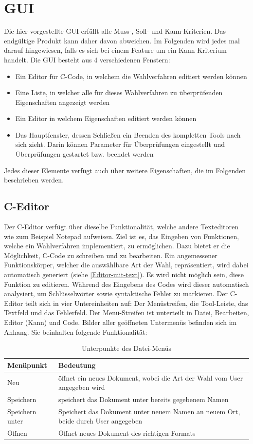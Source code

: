\documentclass[a4paper]{scrreprt}
\begin{document}
\chapter{GUI}
Die hier vorgestellte \ac{GUI} erfüllt alle Muss-, Soll- und Kann-Kriterien. Das endgültige Produkt kann daher davon abweichen. Im Folgenden wird jedes mal darauf hingewiesen, falls es sich bei einem Feature um ein Kann-Kriterium handelt.
Die \ac{GUI} besteht aus 4 verschiedenen Fenstern: 
\begin{itemize}
\item Ein Editor für C-Code, in welchem die Wahlverfahren editiert werden können
\item Eine Liste, in welcher alle für dieses Wahlverfahren zu überprüfenden Eigenschaften angezeigt werden
\item Ein Editor in welchem Eigenschaften editiert werden können
\item Das Hauptfenster, dessen Schließen ein Beenden des kompletten Tools nach sich zieht. Darin können Parameter für Überprüfungen eingestellt und Überprüfungen gestartet bzw. beendet werden
\end{itemize}
Jedes dieser Elemente verfügt auch über weitere Eigenschaften, die im Folgenden beschrieben werden.

\section{C-Editor}
Der C-Editor verfügt über dieselbe Funktionalität, welche andere Texteditoren wie zum Beispiel Notepad aufweisen. Ziel ist es, das Eingeben von Funktionen, welche ein Wahlverfahren implementiert, zu ermöglichen. Dazu bietet er die Möglichkeit, C-Code zu schreiben und zu bearbeiten. Ein angemessener Funktionskörper, welcher die auswählbare Art der Wahl, repräsentiert, wird dabei automatisch generiert (siehe \ref{Editor-mit-text}). Es wird nicht möglich sein, diese Funktion zu editieren. Während des Eingebens des Codes wird dieser automatisch analysiert, um Schlüsselwörter sowie syntaktische Fehler zu markieren. 
Der C-Editor teilt sich in vier Untereinheiten auf: Der Menüstreifen, die Tool-Leiste, das Textfeld und das Fehlerfeld. Der Menü-Streifen ist unterteilt in Datei, Bearbeiten, Editor (Kann) und Code. Bilder aller geöffneten Untermenüs befinden sich im Anhang. Sie beinhalten folgende Funktionalität:

\begin{table}[H]
\begin{tabular}{|p{3cm}|p{12cm}|}
Menüpunkt & Bedeutung \\
\hline
Neu & öffnet ein neues Dokument, wobei die Art der Wahl vom User angegeben wird \\
Speichern & speichert das Dokument unter bereits gegebenem Namen \\
Speichern unter & Speichert das Dokument unter neuem Namen an neuem Ort, beide durch User angegeben \\
Öffnen & Öffnet neues Dokument des richtigen Formats
\end{tabular}
\label{Datei-Menüpunkte}
\caption{Unterpunkte des Datei-Menüs}
\end{table}
\end{document}
